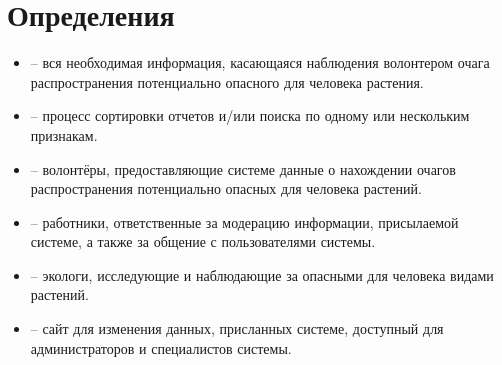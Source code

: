 \section{Определения}

\begin{itemize}[topsep=0pt, parsep=0pt, itemsep=0pt, wide=0.5cm]
	\item {} -- вся необходимая информация, касающаяся наблюдения волонтером очага распространения потенциально опасного для человека растения.
	\item {} -- процесс сортировки отчетов и/или поиска по одному или нескольким признакам.
	\item {} -- волонтёры, предоставляющие системе данные о нахождении очагов распространения потенциально опасных для человека растений.
	\item {} -- работники, ответственные за модерацию информации, присылаемой системе, а также за общение с пользователями системы.
	\item {} -- экологи, исследующие и наблюдающие за опасными для человека видами растений.
	\item {} -- сайт для изменения данных, присланных системе, доступный для администраторов и специалистов системы.
\end{itemize}

\clearpage
